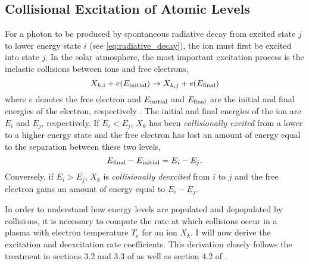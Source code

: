 \subsection{Collisional Excitation of Atomic Levels}\label{subsec:collisional_excitation}

For a photon to be produced by spontaneous radiative decay from excited state $j$ to lower energy state $i$ (see \autoref{eq:radiative_decay}), the ion must first be excited into state $j$. In the solar atmosphere, the most important excitation process is the inelastic collisions between ions and free electrons,
\begin{equation}\label{eq:inelastic_collisions}
    X_{k,i} + e(E_{\textup{initial}}) \to X_{k,j} + e(E_{\textup{final}})
\end{equation}
where $e$ denotes the free electron and $E_{\textup{initial}}$ and $E_{\textup{final}}$ are the initial and final energies of the electron, respectively \citep{phillips_ultraviolet_2008}. The initial and final energies of the ion are $E_i$ and $E_j$, respectively. If $E_i<E_j$, $X_k$ has been \textit{collisionally excited} from a lower to a higher energy state and the free electron has lost an amount of energy equal to the separation between these two levels,
\begin{equation*}
    E_{\textup{final}} - E_{\textup{initial}}  = E_i - E_j.
\end{equation*}
Conversely, if $E_i>E_j$, $X_k$ is \textit{collisionally deexcited} from $i$ to $j$ and the free electron gains an amount of energy equal to $E_i - E_j$.


In order to understand how energy levels are populated and depopulated by collisions, it is necessary to compute the rate at which collisions occur in a plasma with electron temperature $T_e$ for an ion $X_k$. I will now derive the excitation and deexcitation rate coefficients. This derivation closely follows the treatment in sections 3.2 and 3.3 of \citet{del_zanna_solar_2018} as well as section 4.2 of \citet{phillips_ultraviolet_2008}.  

